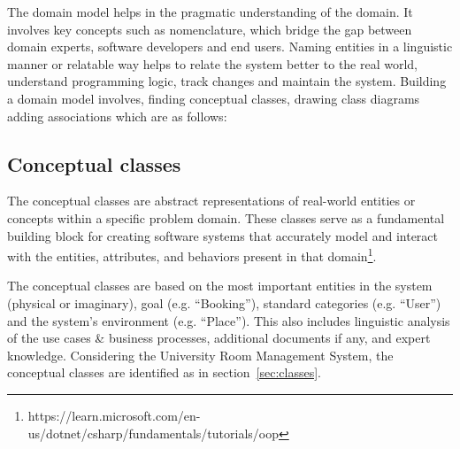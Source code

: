 \documentclass[conference,onecolumn]{IEEEtran}
\begin{document}
	The domain model helps in the pragmatic understanding of the domain. It involves key concepts such as nomenclature, which bridge the gap between domain experts, software developers and end users. Naming entities in a linguistic manner or relatable way helps to relate the system better to the real world, understand programming logic, track changes and maintain the system. Building a domain model involves, finding conceptual classes, drawing class diagrams adding associations which are as follows:



\subsection{Conceptual classes} \label{sec:conceptualclasses}
	The conceptual classes are abstract representations of real-world entities or concepts within a specific problem domain. These classes serve as a fundamental building block for creating software systems that accurately model and interact with the entities, attributes, and behaviors present in that domain\footnote{https://learn.microsoft.com/en-us/dotnet/csharp/fundamentals/tutorials/oop}.


	The conceptual classes are based on the most important entities in the system (physical or imaginary), goal (e.g. ``Booking''), standard categories (e.g. ``User'') and the system's environment (e.g. ``Place''). This also includes linguistic analysis of the use cases \& business processes, additional documents if any, and expert knowledge. Considering the University Room Management System, the conceptual classes are identified as in section~\ref{sec:classes}.
\end{document}
